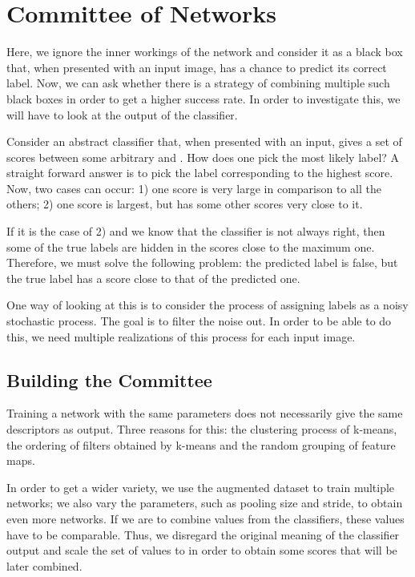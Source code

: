 \documentclass[runningheads]{llncs}
\begin{document}
\section{Committee of Networks}
Here, we ignore the inner workings of the network and consider it as a black box that, when presented with an input image, has a chance to predict its correct label.
Now, we can ask whether there is a strategy of combining multiple such black boxes in order to get a higher success rate. In order to investigate this, we will have to look at the output of the classifier.

Consider an abstract classifier that, when presented with an input, gives a set of  scores between some arbitrary  and . How does one pick the most likely label? A straight forward answer is to pick the label corresponding to the highest score. Now, two cases can occur:
1) one score is very large in comparison to all the others; 2) one score is largest, but has some other scores very close to it.

If it is the case of 2) and we know that the classifier is not always right, then some of the true labels are hidden in the scores close to the maximum one.
Therefore, we must solve the following problem: the predicted label is false, but the true label has a score close to that of the predicted one.

One way of looking at this is to consider the process of assigning labels as a noisy stochastic process. The goal is to filter the noise out. In order to be able to do this, we need multiple realizations of this process for each input image.

\subsection{Building the Committee}

Training a network with the same parameters does not necessarily give the same descriptors as output. Three reasons for this: the clustering process of k-means, the ordering of filters obtained by k-means and the random grouping of feature maps.

In order to get a wider variety, we use the augmented dataset to train multiple networks; we also vary the parameters, such as pooling size and stride, to obtain even more networks.
If we are to combine values from the classifiers, these values have to be comparable. Thus, we disregard the original meaning of the classifier output and scale the set of values to  in order to obtain some scores that will be later combined.
\end{document}
